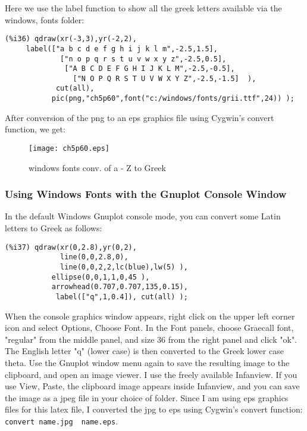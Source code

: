 \documentclass[12pt]{article}
\begin{document}
Here we use the label function to show all the greek letters
 available via the windows, fonts folder:
\small
\begin{verbatim}
(%i36) qdraw(xr(-3,3),yr(-2,2), 
     label(["a b c d e f g h i j k l m",-2.5,1.5],
             ["n o p q r s t u v w x y z",-2.5,0.5],
              ["A B C D E F G H I J K L M",-2.5,-0.5],
                ["N O P Q R S T U V W X Y Z",-2.5,-1.5]  ),     
            cut(all),
           pic(png,"ch5p60",font("c:/windows/fonts/grii.ttf",24)) );
\end{verbatim}
\normalsize
\newpage

After conversion of the png to an eps graphics file using Cygwin's convert function,
we get:
\begin{figure} [h]
   \centerline{\texttt{[image: ch5p60.eps]} }
	\caption{windows fonts conv. of a - Z to Greek}
\end{figure}      

\smallskip

\subsubsection{Using Windows Fonts with the Gnuplot Console Window}
In the default Windows Gnuplot console mode, you can convert some
  Latin letters to Greek as follows:  
  
\small
\begin{verbatim}
(%i37) qdraw(xr(0,2.8),yr(0,2),
             line(0,0,2.8,0),
             line(0,0,2,2,lc(blue),lw(5) ),
           ellipse(0,0,1,1,0,45 ),
           arrowhead(0.707,0.707,135,0.15),
            label(["q",1,0.4]), cut(all) );
\end{verbatim}
\normalsize
When the console graphics window appears, right click on the upper left corner
 icon and select Options, Choose Font.
In the Font panels, choose Graecall font, "regular" from the
  middle panel, and size 36 from the right panel and click "ok".
The English letter "q" (lower case) is then converted to the Greek
  lower case theta.
Use the Gnuplot window menu again to save the resulting image to
  the clipboard, and open an image viewer.
I use the freely available Infanview.
If you use View, Paste, the clipboard image appears inside Infanview,
  and you can save the image as a jpeg file in your choice of folder.
Since I am using eps graphics files for this latex file, I converted
  the jpg to eps using Cygwin's convert function:\\
\verb|convert name.jpg  name.eps|.
\end{document}

